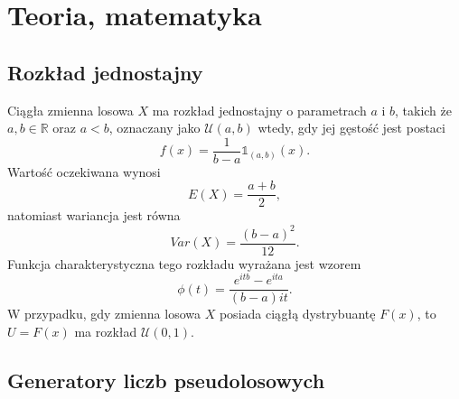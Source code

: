 \documentclass[inzynierska]{pwr_wmat_praca_dyplomowa}
\theoremstyle{plain}
\numberwithin{theorem}{chapter}
\theoremstyle{definition}
\numberwithin{theorem}{chapter}
\begin{document}
\chapter{Teoria, matematyka}

\section{Rozkład jednostajny}
Ciągła zmienna losowa $X$ ma rozkład jednostajny o parametrach $a$ i $b$, takich że $a,b\in \mathds{R}$ oraz $a<b$, oznaczany jako $\mathcal{U}(a,b)$ wtedy, gdy jej gęstość jest postaci
\begin{equation}
f(x)=\frac{1}{b-a}\mathds{1}_{(a,b)}(x).
\end{equation}
Wartość oczekiwana wynosi
\begin{equation}
E(X)=\frac{a+b}{2},
\end{equation}
natomiast wariancja jest równa
\begin{equation}
Var(X)=\frac{(b-a)^2}{12}.
\end{equation} 
Funkcja charakterystyczna tego rozkładu wyrażana jest wzorem
\begin{equation}
\phi(t)=\frac{e^{itb}-e^{ita}}{(b-a)it}.
\end{equation}
W przypadku, gdy zmienna losowa $X$ posiada ciągłą dystrybuantę $F(x)$, to $U=F(x)$ ma rozkład $\mathcal{U}(0,1).$

\section{Generatory liczb pseudolosowych} %
\end{document}
